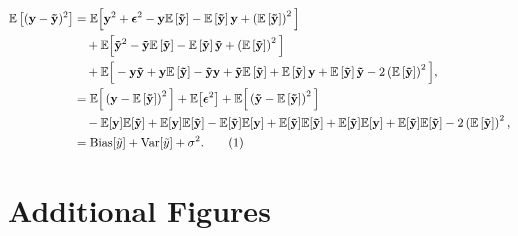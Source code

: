 \documentclass[aps,pra,english,notitlepage,reprint,nofootinbib]{revtex4-1}  %
\newcommand\numberthis{\addtocounter{equation}{1}\tag{\theequation}}
\begin{document}
\begin{align*}
\mathbb{E}\left[(\mathbf{y}-\mathbf{\tilde{y}})^2 \right] 
&= \mathbb{E}\Big[\mathbf{y}^2 + \boldsymbol{\epsilon}^2 - \mathbf{y}\mathbb{E}\left[\mathbf{\tilde{y}}\right] -\mathbb{E}\left[\mathbf{\tilde{y}}\right]\mathbf{y}  + \left(\mathbb{E}\left[\mathbf{\tilde{y}}\right]\right)^2\Big]
\\
&\hspace{10pt} + \mathbb{E}\Big[\mathbf{\tilde{y}}^2 - \mathbf{\tilde{y}}\mathbb{E}\left[\mathbf{\tilde{y}}\right] - \mathbb{E}\left[\mathbf{\tilde{y}}\right]\mathbf{\tilde{y}} + \left(\mathbb{E}\left[\mathbf{\tilde{y}}\right]\right)^2\Big]
\\
&\hspace{10pt} +\mathbb{E}\Big[-\mathbf{y}\mathbf{\tilde{y}} + \mathbf{y}\mathbb{E}\left[\mathbf{\tilde{y}} \right] - \mathbf{\tilde{y}}\mathbf{y} + \mathbf{\tilde{y}}\mathbb{E}\left[\mathbf{\tilde{y}}\right] +\mathbb{E}\left[\mathbf{\tilde{y}}\right]\mathbf{y} + \mathbb{E}\left[\mathbf{\tilde{y}}\right]\mathbf{\tilde{y}} - 2\left(\mathbb{E}\left[\mathbf{\tilde{y}}\right]\right)^2\Big],
\\
&= \mathbb{E}\Big[\left(\mathbf{y} - \mathbb{E}\left[\mathbf{\tilde{y}}\right]\right)^2\Big] + \mathbb{E}\big[\boldsymbol{\epsilon}^2\big] + \mathbb{E}\Big[\left(\mathbf{\tilde{y}} - \mathbb{E}\left[\mathbf{\tilde{y}}\right]\right)^2\Big]
\\
&\hspace{10pt} - \mathbb{E}[\mathbf{y}]\mathbb{E}[\mathbf{\tilde{y}}] + \mathbb{E}[\mathbf{y}]\mathbb{E}[\mathbf{\tilde{y}}] - \mathbb{E}[\mathbf{\tilde{y}}]\mathbb{E}[\mathbf{y}] + \mathbb{E}[\mathbf{\tilde{y}}]\mathbb{E}[\mathbf{\tilde{y}}] + \mathbb{E}[\mathbf{\tilde{y}}]\mathbb{E}[\mathbf{y}] + \mathbb{E}[\mathbf{\tilde{y}}]\mathbb{E}[\mathbf{\tilde{y}}] - 2\left(\mathbb{E}\left[\mathbf{\tilde{y}}\right]\right)^2,
\\
&= \text{Bias}[\tilde{y}] + \text{Var}[\tilde{y}] + \sigma^2. \numberthis \label{appeq:cost OLS}
\end{align*}


\section{Additional Figures}\label{appsec:figures}
\end{document}
